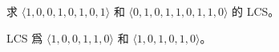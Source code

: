 \startEXERCISE
求 $\langle 1,0,0,1,0,1,0,1\rangle$ 和
 $\langle 0,1,0,1,1,0,1,1,0\rangle$ 的 LCS。
\stopEXERCISE

\startANSWER
LCS 爲 $\langle 1,0,0,1,1,0\rangle$
 和 $\langle 1,0,1,0,1,0\rangle$。

\externalfigure[e14_4_1-1]
\stopANSWER
